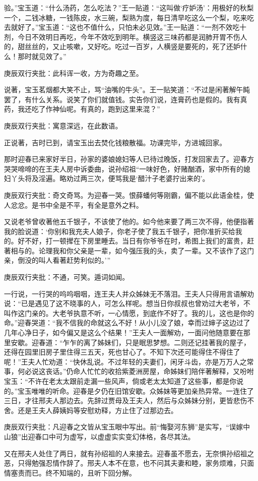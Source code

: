 \begin{parag}
验。”宝玉道：“什么汤药，怎么吃法？”王一贴道：“这叫做‘疗妒汤’：用极好的秋梨一个，二钱冰糖，一钱陈皮，水三碗，梨熟为度，每日清早吃这么一个梨，吃来吃去就好了。”宝玉道：“这也不值什么，只怕未必见效。”王一贴道：“一剂不效吃十剂，今日不效明日再吃，今年不效吃到明年。横竖这三味药都是润肺开胃不伤人的，甜丝丝的，又止咳嗽，又好吃。吃过一百岁，人横竖是要死的，死了还妒什么！那时就见效了。”\begin{note}庚辰双行夹批：此科诨一收，方为奇趣之至。\end{note}说著，宝玉茗烟都大笑不止，骂“油嘴的牛头”。王一贴笑道：“不过是闲著解午盹罢了，有什么关系。说笑了你们就值钱。实告你们说，连膏药也是假的。我有真药，我还吃了作神仙呢。有真的，跑到这里来混？”\begin{note}庚辰双行夹批：寓意深远，在此数语。\end{note}正说著，吉时已到，请宝玉出去焚化钱粮散福。功课完毕，方进城回家。
\end{parag}


\begin{parag}
    那时迎春已来家好半日，孙家的婆娘媳妇等人已待过晚饭，打发回家去了。迎春方哭哭啼啼的在王夫人房中诉委曲，说孙绍祖“一味好色，好赌酗酒，家中所有的媳妇丫头将及淫遍。略劝过两三次，便骂我是‘醋汁子老婆拧出来的’。\begin{note}庚辰双行夹批：奇文奇骂。为迎春一哭。恨薛蟠何等刚霸，偏不能以此语金桂，使人忿忿。是书中全是不平，有全是意外之料。\end{note}又说老爷曾收著他五千银子，不该使了他的。如今他来要了两三次不得，他便指著我的脸说道：‘你别和我充夫人娘子，你老子使了我五千银子，把你准折买给我的。好不好，打一顿撵在下房里睡去。当日有你爷爷在时，希图上我们的富贵，赶著相与的。论理我和你父亲是一辈，如今强压我的头，卖了一辈。又不该作了这门亲，倒没的叫人看著赶势利似的。’”\begin{note}庚辰双行夹批：不通，可笑。遁词如闻。\end{note}一行说，一行哭的呜呜咽咽，连王夫人并众姊妹无不落泪。王夫人只得用言语解劝说：“已是遇见了这不晓事的人，可怎么样呢。想当日你叔叔也曾劝过大老爷，不叫作这门亲的。大老爷执意不听，一心情愿，到底作不好了。我的儿，这也是你的命。”迎春哭道：“我不信我的命就这么不好！从小儿没了娘，幸而过婶子这边过了几年心净日子，如今偏又是这么个结果！”王夫人一面解劝，一面问他随意要在那里安歇。迎春道：“乍乍的离了姊妹们，只是眠思梦想。二则还记挂著我的屋子，还得在园里旧房子里住得三五天，死也甘心了。不知下次还可能得住不得住了呢！”王夫人忙劝道：“快休乱说。不过年轻的夫妻们，闲牙斗齿，亦是万万人之常事，何必说这丧话。”仍命人忙忙的收拾紫菱洲房屋，命姊妹们陪伴著解释，又吩咐宝玉：“不许在老太太跟前走漏一些风声，倘或老太太知道了这些事，都是你说的。”宝玉唯唯的听命。迎春是夕仍在旧馆安歇。众姊妹等更加亲热异常。一连住了三日，才往邢夫人那边去。先辞过贾母及王夫人，然后与众姊妹分别，更皆悲伤不舍。还是王夫人薛姨妈等安慰劝释，方止住了过那边去。\begin{note}庚辰双行夹批：凡迎春之文皆从宝玉眼中写出。前“悔娶河东狮”是实写，“误嫁中山狼”出迎春口中可为虚写，以虚虚实实变幻体格，各尽其法。\end{note}又在邢夫人处住了两日，就有孙绍祖的人来接去。迎春虽不愿去，无奈惧孙绍祖之恶，只得勉强忍情作辞了。邢夫人本不在意，也不问其夫妻和睦，家务烦难，只面情塞责而已。终不知端的，且听下回分解。
\end{parag}


